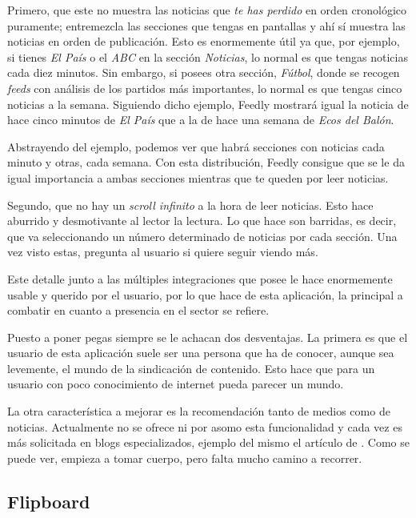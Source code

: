 Primero, que este no muestra las noticias que \textit{te has perdido} en orden cronológico puramente; entremezcla las secciones que tengas en pantallas y ahí sí muestra las noticias en orden de publicación. Esto es enormemente útil ya que, por ejemplo, si tienes \textit{El País} o el \textit{ABC} en la sección \textit{Noticias}, lo normal es que tengas noticias cada diez minutos. Sin embargo, si posees otra sección, \textit{Fútbol}, donde se recogen \textit{feeds} con análisis de los partidos más importantes, lo normal es que tengas cinco noticias a la semana. Siguiendo dicho ejemplo, Feedly mostrará igual la noticia de hace cinco minutos de \textit{El País} que a la de hace una semana de \textit{Ecos del Balón}.

Abstrayendo del ejemplo, podemos ver que habrá secciones con noticias cada minuto y otras, cada semana. Con esta distribución, Feedly consigue que se le da igual importancia a ambas secciones mientras que te queden por leer noticias.


Segundo, que no hay un \textit{scroll infinito} a la hora de leer noticias. Esto hace aburrido y desmotivante al lector la lectura. Lo que hace son barridas, es decir, que va seleccionando un número determinado de noticias por cada sección. Una vez visto estas, pregunta al usuario si quiere seguir viendo más.

Este detalle junto a las múltiples integraciones que posee le hace enormemente usable y querido por el usuario, por lo que hace de esta aplicación, la principal a combatir en cuanto a presencia en el sector se refiere.

Puesto a poner pegas siempre se le achacan dos desventajas. La primera es que el usuario de esta aplicación suele ser una persona que ha de conocer, aunque sea levemente, el mundo de la sindicación de contenido. Esto hace que para un usuario con poco conocimiento de internet pueda parecer un mundo.

La otra característica a mejorar es la recomendación tanto de medios como de noticias. Actualmente no se ofrece ni por asomo esta funcionalidad y cada vez es más solicitada en blogs especializados, ejemplo del mismo el artículo de . Como se puede ver, empieza a tomar cuerpo, pero falta mucho camino a recorrer.

\subsection{Flipboard}

